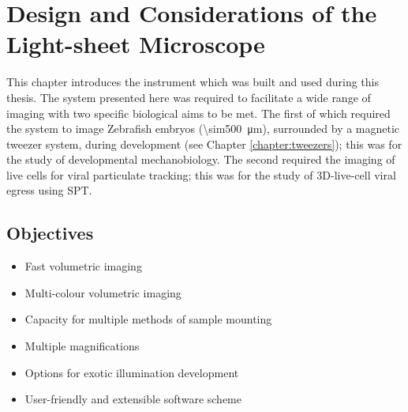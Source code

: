 

\ifpdf
    \graphicspath{{Chapters/design/Figs/Raster/}{Chapters/design/Figs/PDF/}{Chapters/design/Figs/}}
\else
    \graphicspath{{Chapters/design/Figs/Vector/}{Chapters/design/Figs/}}
\fi



\chapter{Design and Considerations of the Light-sheet Microscope}\label{chapter:design}

This chapter introduces the instrument which was built and used during this thesis.
The system presented here was required to facilitate a wide range of imaging with two specific biological aims to be met.
The first of which required the system to image Zebrafish embryos (\SI{\sim500}{\micro\meter}), surrounded by a magnetic tweezer system, during development (see Chapter \ref{chapter:tweezers}); this was for the study of developmental mechanobiology.
The second required the imaging of live cells for viral particulate tracking; this was for the study of 3D-live-cell viral egress using SPT.

\section{Objectives}

\begin{itemize}
    \item Fast volumetric imaging
    \item Multi-colour volumetric imaging
    \item Capacity for multiple methods of sample mounting
    \item Multiple magnifications
    \item Options for exotic illumination development
    \item User-friendly and extensible software scheme
\end{itemize}

